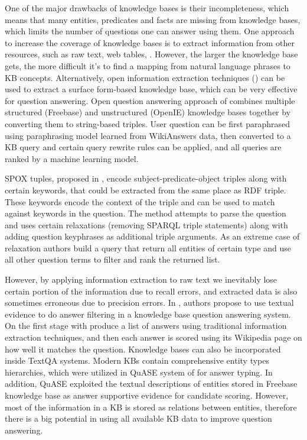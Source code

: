 One of the major drawbacks of knowledge bases is their incompleteness, which means that many entities, predicates and facts are missing from knowledge bases, which limits the number of questions one can answer using them.
One approach to increase the coverage of knowledge bases is to extract information from other resources, such as raw text\cite{MintzBSJ09,jijkoun2004information,Gupta:2014:BOS:2732286.2732288}, web tables\cite{cafarella2008webtables}, \etc.
However, the larger the knowledge base gets, the more difficult it's to find a mapping from natural language phrases to KB concepts.
Alternatively, open information extraction techniques (\cite{Etzioni:2008:OIE:1409360.1409378}) can be used to extract a surface form-based knowledge base, which can be very effective for question answering.
Open question answering approach of \cite{Fader:2014:OQA:2623330.2623677} combines multiple structured (Freebase) and unstructured (OpenIE) knowledge bases together by converting them to string-based triples.
User question can be first paraphrased using paraphrasing model learned from WikiAnswers data, then converted to a KB query and certain query rewrite rules can be applied, and all queries are ranked by a machine learning model.

SPOX tuples, proposed in \cite{yahya2013robust}, encode subject-predicate-object triples along with certain keywords, that could be extracted from the same place as RDF triple.
These keywords encode the context of the triple and can be used to match against keywords in the question. The method attempts to parse the question and uses certain relaxations (removing SPARQL triple statements) along with adding question keyphrases as additional triple arguments.
As an extreme case of relaxation authors build a query that return all entities of certain type and use all other question terms to filter and rank the returned list.

However, by applying information extraction to raw text we inevitably lose certain portion of the information due to recall errors, and extracted data is also sometimes erroneous due to precision errors.
In \cite{xu2016enhancing}, authors propose to use textual evidence to do answer filtering in a knowledge base question answering system.
On the first stage with produce a list of answers using traditional information extraction techniques, and then each answer is scored using its Wikipedia page on how well it matches the question. 
Knowledge bases can also be incorporated inside TextQA systems.
Modern KBs contain comprehensive entity types hierarchies, which were utilized in QuASE system of \cite{Sun:2015:ODQ:2736277.2741651} for answer typing.
In addition, QuASE exploited the textual descriptions of entities stored in Freebase knowledge base as answer supportive evidence for candidate scoring.
However, most of the information in a KB is stored as relations between entities, therefore there is a big potential in using all available KB data to improve question answering.


